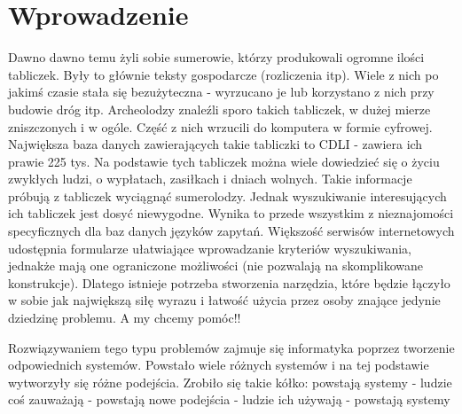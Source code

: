 \chapter*{Wprowadzenie}


Dawno dawno temu żyli sobie sumerowie, którzy produkowali ogromne ilości tabliczek. Były to głównie teksty gospodarcze (rozliczenia itp). Wiele z nich po jakimś czasie stała się bezużyteczna - wyrzucano je lub korzystano z nich przy budowie dróg itp. Archeolodzy znaleźli sporo takich tabliczek, w dużej mierze zniszczonych i w ogóle. Część z nich wrzucili do komputera w formie cyfrowej. Największa baza danych zawierających takie tabliczki to CDLI - zawiera ich prawie 225 tys.
Na podstawie tych tabliczek można wiele dowiedzieć się o życiu zwykłych ludzi, o wypłatach, zasiłkach i dniach wolnych. Takie informacje próbują z tabliczek wyciągnąć sumerolodzy.
Jednak wyszukiwanie interesujących ich tabliczek jest dosyć niewygodne. Wynika to przede wszystkim z nieznajomości specyficznych dla baz danych języków zapytań. 
Większość serwisów internetowych udostępnia formularze ułatwiające wprowadzanie kryteriów wyszukiwania, jednakże mają one ograniczone możliwości (nie pozwalają na skomplikowane konstrukcje). Dlatego istnieje potrzeba stworzenia narzędzia, które będzie łączyło w sobie jak największą siłę wyrazu i łatwość użycia przez osoby znające jedynie dziedzinę problemu. A my chcemy pomóc!!

Rozwiązywaniem tego typu problemów zajmuje się informatyka poprzez tworzenie odpowiednich systemów. Powstało wiele różnych systemów i na tej podstawie wytworzyły się różne podejścia. Zrobiło się takie kółko: powstają systemy - ludzie coś zauważają - powstają nowe podejścia - ludzie ich używają - powstają systemy

